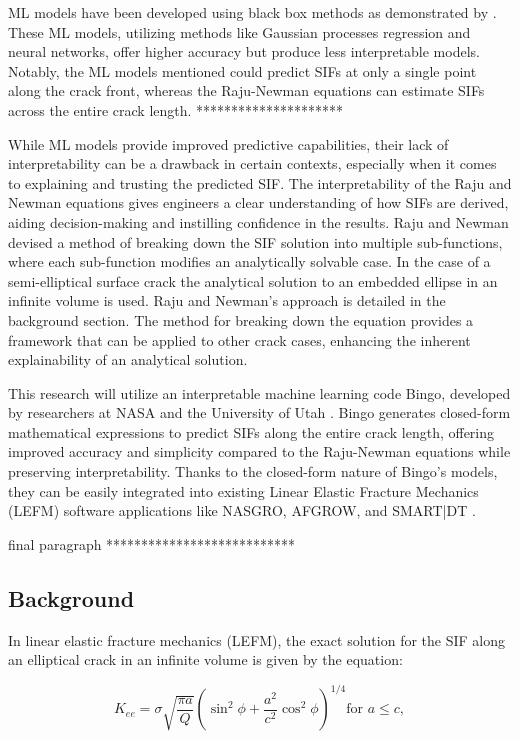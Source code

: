 ML models have been developed using black box methods as demonstrated by \cite{Keprate2017, Xu2022, Seghier2020}. These ML models, utilizing methods like Gaussian processes regression and neural networks, offer higher accuracy but produce less interpretable models. Notably, the ML models mentioned could predict SIFs at only a single point along the crack front, whereas the Raju-Newman equations can estimate SIFs across the entire crack length.
*********************

While ML models provide improved predictive capabilities, their lack of interpretability can be a drawback in certain contexts, especially when it comes to explaining and trusting the predicted SIF. The interpretability of the Raju and Newman equations gives engineers a clear understanding of how SIFs are derived, aiding decision-making and instilling confidence in the results. Raju and Newman devised a method of breaking down the SIF solution into multiple sub-functions, where each sub-function modifies an analytically solvable case. In the case of a semi-elliptical surface crack the analytical solution to an embedded ellipse in an infinite volume is used. Raju and Newman's approach is detailed in the background section. The method for breaking down the equation provides a framework that can be applied to other crack cases, enhancing the inherent explainability of an analytical solution. 

This research will utilize an interpretable machine learning code Bingo, developed by researchers at NASA and the University of Utah \cite{Randall2022}. Bingo generates closed-form mathematical expressions to predict SIFs along the entire crack length, offering improved accuracy and simplicity compared to the Raju-Newman equations while preserving interpretability. Thanks to the closed-form nature of Bingo's models, they can be easily integrated into existing Linear Elastic Fracture Mechanics (LEFM) software applications like NASGRO, AFGROW, and SMART|DT \cite{nasgro, afgrow, smartdt}.

final paragraph
***************************

\subsection{Background}
In linear elastic fracture mechanics (LEFM), the exact solution for the SIF along an elliptical crack in an infinite volume is given by the equation:

\begin{equation} \label{eqn:K_embedded_ellipse}
    K_{ee} = \sigma \sqrt{\frac{\pi a}{Q}} \left( \sin^2 \phi + \frac{a^2}{c^2} \cos^2 \phi \right)^{1/4} \text{for } a \le c, 
\end{equation}

